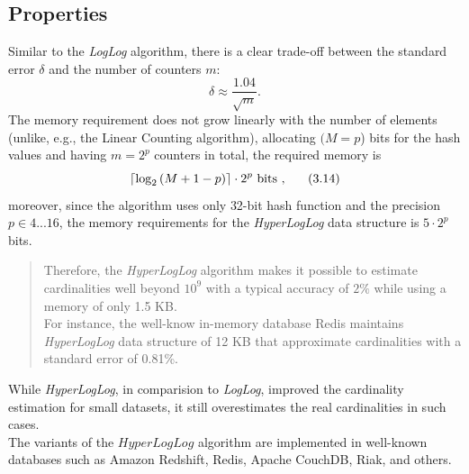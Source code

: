 \documentclass[a4paper,13pt]{article}
\theoremstyle{mytheor}
\begin{document}
\subsection*{Properties}
Similar to the \textit{LogLog} algorithm, there is a clear trade-off between
the standard error $\delta$ and the number of counters $m$:
\[\delta \approx \frac{1.04}{\sqrt{m}}.\]
\indent The memory requirement does not grow linearly with the number of
elements (unlike, e.g., the Linear Counting algorithm), allocating $(M=p$)
bits for the hash values and having $m = 2^p$ counters in total, the required
memory is
\[\lceil\log_2\left(M + 1 - p\right)\rceil\cdot2^p \text{ bits , \indent (3.14)}\]
moreover, since the algorithm uses only 32-bit hash function and
the precision $p \in 4...16$, the memory requirements for
the \textit{HyperLogLog} data structure is $5\cdot 2^p$ bits.\\
\vspace{0.4cm}
\begin{quote}
    Therefore, the \textit{HyperLogLog} algorithm makes it possible to estimate
    cardinalities well beyond $10^9$ with a typical accuracy of $2\%$ while using
    a memory of only 1.5 KB.\\
    For instance, the well-know in-memory database Redis maintains
    \textit{HyperLogLog} data structure of 12 KB that approximate cardinalities
    with a standard error of 0.81\%.
    \vspace{0.25cm}
\end{quote}

While \textit{HyperLogLog}, in comparision to \textit{LogLog}, improved
the cardinality estimation for small datasets, it still overestimates
the real cardinalities in such cases.\\
\indent The variants of the $HyperLogLog$ algorithm are implemented in well-known
databases such as Amazon Redshift, Redis, Apache CouchDB, Riak, and others.
\end{document}
